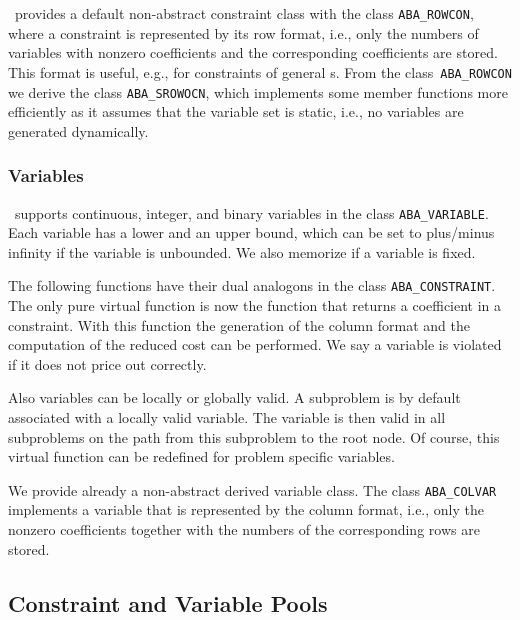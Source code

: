 \ABACUS\ provides a default non-abstract constraint class with
the class {\tt ABA\_ROWCON}, where a 
constraint is represented by its row format, 
i.e., only the numbers
of variables with nonzero coefficients and the corresponding coefficients
are stored.
This format is useful, e.g., for
constraints of general \mip s. From the class~{\tt ABA\_ROWCON} we derive the
class {\tt ABA\_SROWOCN}, 
which implements some member functions more efficiently
as it assumes that the variable set is static, i.e., no variables are 
generated dynamically.

\subsubsection{Variables}

\ABACUS\ supports continuous, 
integer, and binary variables
in the class {\tt ABA\_VARIABLE}. Each variable
has a lower and an upper bound, which can be set to plus/minus infinity if the
variable is unbounded. We also memorize if a variable is fixed.

The following functions have their dual analogons in the class
{\tt ABA\_CONSTRAINT}. The only pure virtual function is now the function
that returns a coefficient in a constraint. With this function
the generation of the column format and the computation of the reduced
cost can be performed. We say a variable is violated if it does
not price out correctly.

Also variables can be locally or globally valid.
A subproblem is by default associated with a 
locally valid variable. 
The variable is then valid in all
subproblems on the path from this subproblem to the root node. Of course,
this virtual function can be redefined for problem specific variables.

We provide already a non-abstract derived variable class.
The class {\tt ABA\_COLVAR} implements a variable
that is represented by the column format, 
i.e., only the nonzero
coefficients together with the numbers of the corresponding rows are
stored.

\subsection{Constraint and Variable Pools}
\label{section:DesignPool}

